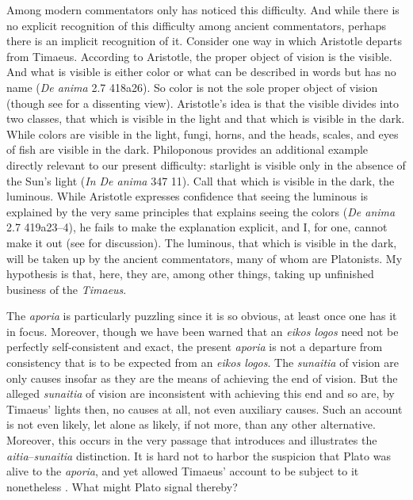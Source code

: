 Among modern commentators only \citet[180--1]{Broadie:2012vl} has noticed this difficulty. And while there is no explicit recognition of this difficulty among ancient commentators, perhaps there is an implicit recognition of it. Consider one way in which Aristotle departs from Timaeus. According to Aristotle, the proper object of vision is the visible. And what is visible is either color or what can be described in words but has no name (\emph{De anima} 2.7 418a26). So color is not the sole proper object of vision (though see \citealt[252]{Polansky:2007ly} for a dissenting view). Aristotle's idea is that the visible divides into two classes, that which is visible in the light and that which is visible in the dark. While colors are visible in the light, fungi, horns, and the heads, scales, and eyes of fish are visible in the dark. Philoponous provides an additional example directly relevant to our present difficulty: starlight is visible only in the absence of the Sun's light (\emph{In De anima} 347 11). Call that which is visible in the dark, the luminous. While Aristotle expresses confidence that seeing the luminous is explained by the very same principles that explains seeing the colors (\emph{De anima} 2.7 419a23--4), he fails to make the explanation explicit, and I, for one, cannot make it out (see \citealt[69--73]{Kalderon:2015fr} for discussion). The luminous, that which is visible in the dark, will be taken up by the ancient commentators, many of whom are Platonists. My hypothesis is that, here, they are, among other things, taking up unfinished business of the \emph{Timaeus}.

The \emph{aporia} is particularly puzzling since it is so obvious, at least once one has it in focus. Moreover, though we have been warned that an \emph{eikos logos} need not be perfectly self-consistent and exact, the present \emph{aporia} is not a departure from consistency that is to be expected from an \emph{eikos logos}. The \emph{sunaitia} of vision are only causes insofar as they are the means of achieving the end of vision. But the alleged \emph{sunaitia} of vision are inconsistent with achieving this end and so are, by Timaeus' lights then, no causes at all, not even auxiliary causes. Such an account is not even likely, let alone as likely, if not more, than any other alternative. Moreover, this occurs in the very passage that introduces and illustrates the \emph{aitia}--\emph{sunaitia} distinction. It is hard not to harbor the suspicion that Plato was alive to the \emph{aporia}, and yet allowed Timaeus' account to be subject to it nonetheless \citep[180]{Broadie:2012vl}. What might Plato signal thereby? 

